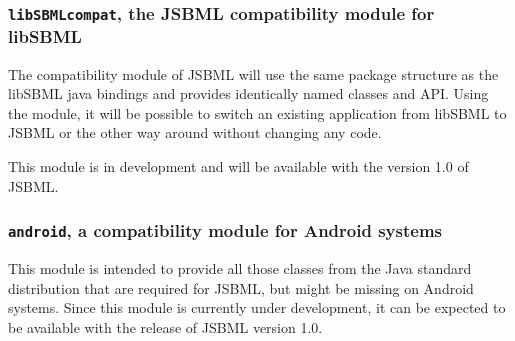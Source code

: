 \subsubsection{\texttt{libSBMLcompat}, the JSBML compatibility module for
libSBML}

The compatibility module of JSBML will use the same package structure as the
libSBML java bindings and provides identically named classes and API. Using the
module, it will be possible to switch an existing application from libSBML to
JSBML or the other way around without changing any code.

This module is in development and will be available with the version 1.0 of
JSBML.
%

\subsubsection{\texttt{android}, a compatibility module for Android systems}
This module is intended to provide all those classes from the Java\texttrademark{}
standard distribution that are required for JSBML, but might be missing on
Android systems. Since this module is currently under development, it can be
expected to be available with the release of JSBML version 1.0.

